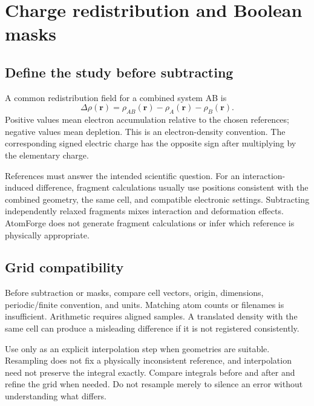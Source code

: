 \chapter{Charge redistribution and Boolean masks}\label{ch:charge}
\section{Define the study before subtracting}
A common redistribution field for a combined system AB is
\[
\Delta\rho(\mathbf r)=\rho_{AB}(\mathbf r)-\rho_A(\mathbf r)-\rho_B(\mathbf r).
\]
Positive values mean electron accumulation relative to the chosen references; negative values mean depletion. This is an electron-density convention. The corresponding signed electric charge has the opposite sign after multiplying by the elementary charge.

References must answer the intended scientific question. For an interaction-induced difference, fragment calculations usually use positions consistent with the combined geometry, the same cell, and compatible electronic settings. Subtracting independently relaxed fragments mixes interaction and deformation effects. AtomForge does not generate fragment calculations or infer which reference is physically appropriate.

\section{Grid compatibility}
Before subtraction or masks, compare cell vectors, origin, dimensions, periodic/finite convention, and units. Matching atom counts or filenames is insufficient. Arithmetic requires aligned samples. A translated density with the same cell can produce a misleading difference if it is not registered consistently.

Use  only as an explicit interpolation step when geometries are suitable. Resampling does not fix a physically inconsistent reference, and interpolation need not preserve the integral exactly. Compare integrals before and after and refine the grid when needed. Do not resample merely to silence an error without understanding what differs.

